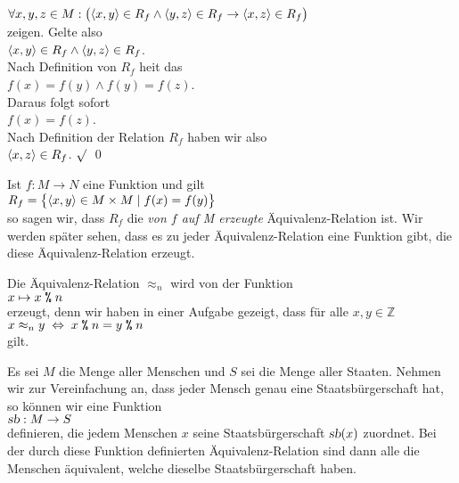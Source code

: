 \begin{enumerate}
      \hspace*{1.3cm}
      $\forall x,y,z \in M: \bigl(\pair(x,y) \in R_f \wedge \pair(y,z) \in R_f \rightarrow 
                            \pair(x,z) \in R_f\bigr)
      $
      \\[0.2cm]
      zeigen.  Gelte also 
      \\[0.2cm]
      \hspace*{1.3cm}
      $\pair(x,y) \in R_f \wedge \pair(y,z) \in R_f$.
      \\[0.2cm]
      Nach Definition von $R_f$ hei\3t das 
      \\[0.2cm]
      \hspace*{1.3cm}
      $f(x) = f(y) \wedge f(y) = f(z)$.
      \\[0.2cm]
      Daraus folgt sofort 
      \\[0.2cm]
      \hspace*{1.3cm}
      $f(x) = f(z)$.
      \\[0.2cm]
      Nach Definition der Relation $R_f$ haben wir also 
      \\[0.2cm]
      \hspace*{1.3cm}
      $\pair(x,z) \in R_f$. $\surd$
      \qed
\end{enumerate}


\remark
Ist $f: M \rightarrow N$ eine Funktion und gilt
\\[0.2cm]
\hspace*{1.3cm}
$R_f = \bigl\{ \pair(x,y) \in M \times M \mid f(x) = f(y) \bigr\}$ 
\\[0.2cm]
so sagen wir, dass $R_f$ die \emph{von $f$ auf M erzeugte} \"{A}quivalenz-Relation ist.  Wir werden
sp\"{a}ter sehen, dass es zu jeder  \"{A}quivalenz-Relation eine Funktion gibt, die diese
\"{A}quivalenz-Relation erzeugt. \eox 
\pagebreak

\example 
Die \"{A}quivalenz-Relation $\approx_n$ wird von der Funktion
\\[0.2cm]
\hspace*{1.3cm}
$x \mapsto x \;\texttt{\%}\; n$
\\[0.2cm]
erzeugt, denn wir haben in einer Aufgabe gezeigt, dass f\"{u}r alle $x,y \in \mathbb{Z}$ 
\\[0.2cm]
\hspace*{1.3cm}
$x \approx_n y \;\Leftrightarrow\; x \;\texttt{\%}\; n = y \;\texttt{\%}\; n$
\\[0.2cm]
gilt.
\eox


\example
Es sei $M$ die Menge aller Menschen und $S$ sei die Menge aller Staaten.  Nehmen wir zur
Vereinfachung an, dass jeder Mensch genau eine Staatsb\"{u}rgerschaft hat, so k\"{o}nnen wir eine Funktion
\\[0.2cm]
\hspace*{1.3cm}
$\textsl{sb}: M \rightarrow S$
\\[0.2cm]
definieren, die jedem Menschen $x$ seine Staatsb\"{u}rgerschaft $\textsl{sb}(x)$ zuordnet.  Bei der durch
diese Funktion definierten \"{A}quivalenz-Relation sind dann alle die Menschen \"{a}quivalent, welche dieselbe
Staatsb\"{u}rgerschaft haben.  \eox

